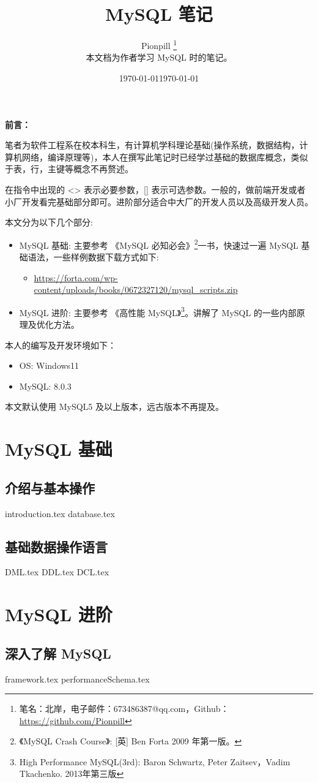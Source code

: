 \documentclass{PionpillNote-book}
\title{MySQL 笔记}
\author{
    Pionpill \footnote{笔名：北岸，电子邮件：673486387@qq.com，Github：\url{https://github.com/Pionpill}} \\
    本文档为作者学习 MySQL 时的笔记。\\
}
\date{\today}
\begin{document}
\pagestyle{plain}
\maketitle

\noindent\textbf{前言：}

笔者为软件工程系在校本科生，有计算机学科理论基础(操作系统，数据结构，计算机网络，编译原理等)，本人在撰写此笔记时已经学过基础的数据库概念，类似于表，行，主键等概念不再赘述。

在指令中出现的 <> 表示必要参数，[] 表示可选参数。一般的，做前端开发或者小厂开发看完基础部分即可。进阶部分适合中大厂的开发人员以及高级开发人员。

本文分为以下几个部分:
\begin{itemize}
    \item MySQL 基础: 主要参考 《MySQL 必知必会》\footnote{《MySQL Crash Course》: [英] Ben Forta 2009 年第一版。}一书，快速过一遍 MySQL 基础语法，一些样例数据下载方式如下:
    \begin{itemize}
        \item \url{https://forta.com/wp-content/uploads/books/0672327120/mysql_scripts.zip}
    \end{itemize}
    \item MySQL 进阶: 主要参考 《高性能 MySQL》\footnote{High Performance MySQL(3rd): Baron Schwartz, Peter Zaitsev，Vadim Tkachenko. 2013年第三版}。讲解了 MySQL 的一些内部原理及优化方法。
\end{itemize}

本人的编写及开发环境如下：
\begin{itemize}
    \item OS: Windows11 
    \item MySQL: 8.0.3
\end{itemize}

本文默认使用 MySQL5 及以上版本，远古版本不再提及。

\date{\today}
\newpage

\tableofcontents

\newpage

\setcounter{page}{1} 
\pagestyle{fancy}

\part{MySQL 基础}
\chapter{介绍与基本操作}
{introduction.tex}
{database.tex}
\chapter{基础数据操作语言}
{DML.tex}
{DDL.tex}
{DCL.tex}

\part{MySQL 进阶}
\chapter{深入了解 MySQL}
{framework.tex}
{performanceSchema.tex}
\end{document}
